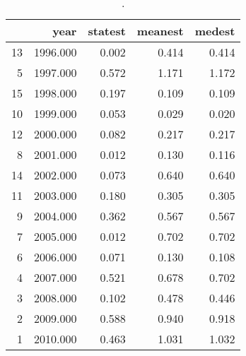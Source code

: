 \begin{table}[ht]
\centering
\begin{tabular}{rrrrr}
  \hline
 & year & statest & meanest & medest \\ 
  \hline
13 & 1996.000 & 0.002 & 0.414 & 0.414 \\ 
  5 & 1997.000 & 0.572 & 1.171 & 1.172 \\ 
  15 & 1998.000 & 0.197 & 0.109 & 0.109 \\ 
  10 & 1999.000 & 0.053 & 0.029 & 0.020 \\ 
  12 & 2000.000 & 0.082 & 0.217 & 0.217 \\ 
  8 & 2001.000 & 0.012 & 0.130 & 0.116 \\ 
  14 & 2002.000 & 0.073 & 0.640 & 0.640 \\ 
  11 & 2003.000 & 0.180 & 0.305 & 0.305 \\ 
  9 & 2004.000 & 0.362 & 0.567 & 0.567 \\ 
  7 & 2005.000 & 0.012 & 0.702 & 0.702 \\ 
  6 & 2006.000 & 0.071 & 0.130 & 0.108 \\ 
  4 & 2007.000 & 0.521 & 0.678 & 0.702 \\ 
  3 & 2008.000 & 0.102 & 0.478 & 0.446 \\ 
  2 & 2009.000 & 0.588 & 0.940 & 0.918 \\ 
  1 & 2010.000 & 0.463 & 1.031 & 1.032 \\ 
   \hline
\end{tabular}
\caption{.} 
\label{spe-by-year-table-fy3}
\end{table}
